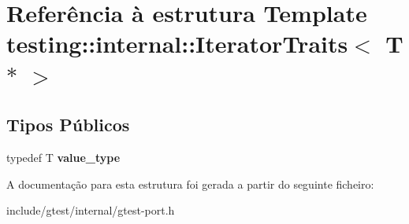 \hypertarget{structtesting_1_1internal_1_1IteratorTraits_3_01T_01_5_01_4}{\section{Referência à estrutura Template testing\-:\-:internal\-:\-:Iterator\-Traits$<$ T $\ast$ $>$}
\label{structtesting_1_1internal_1_1IteratorTraits_3_01T_01_5_01_4}
}
\subsection*{Tipos Públicos}
\begin{DoxyCompactItemize}
\item 
\hypertarget{structtesting_1_1internal_1_1IteratorTraits_3_01T_01_5_01_4_a7e46869ed36cc5aea898e243d270a8be}{typedef T {\bfseries value\-\_\-type}}\label{structtesting_1_1internal_1_1IteratorTraits_3_01T_01_5_01_4_a7e46869ed36cc5aea898e243d270a8be}

\end{DoxyCompactItemize}


A documentação para esta estrutura foi gerada a partir do seguinte ficheiro\-:\begin{DoxyCompactItemize}
\item 
include/gtest/internal/gtest-\/port.\-h\end{DoxyCompactItemize}
